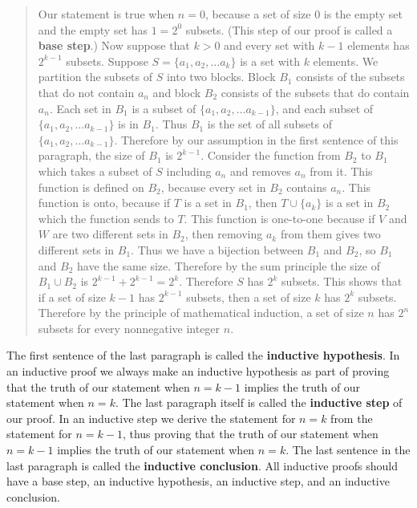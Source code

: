 \documentclass[10pt,]{book}
\newcommand{\terminology}[1]{\textbf{#1}}
\theoremstyle{plain}
\theoremstyle{definition}
\theoremstyle{definition}
\numberwithin{equation}{chapter}
\begin{document}
\begin{quote}\hypertarget{blockquote-20}{}
\hypertarget{p-1998}{}%
Our statement is true when \(n=0\), because a set of size 0 is the empty set and the empty set has \(1=2^0\) subsets. (This step of our proof is called a \terminology{base step}.) Now suppose that \(k>0\) and every set with \(k-1\) elements has \(2^{k-1}\) subsets.  Suppose \(S=\{a_1,a_2,\ldots a_k\}\) is a set with \(k\) elements. We partition the subsets of \(S\) into two blocks.  Block \(B_1\) consists of the subsets that do not contain \(a_n\) and block \(B_2\) consists of the subsets that do contain \(a_n\).  Each set in \(B_1\) is a subset of \(\{a_1,a_2,\ldots a_{k-1}\}\), and each subset of \(\{a_1,a_2, \ldots
a_{k-1}\}\) is in \(B_1\).  Thus \(B_1\) is the set of all subsets of \(\{a_1,a_2,\ldots a_{k-1}\}\).  Therefore by our assumption in the first sentence of this paragraph, the size of \(B_1\) is \(2^{k-1}\).  Consider the function from \(B_2\) to \(B_1\) which takes a subset of \(S\) including \(a_n\) and removes \(a_n\) from it.  This function is defined on \(B_2\), because every set in \(B_2\) contains \(a_n\).  This function is onto, because if \(T\) is a set in \(B_1\), then \(T\cup \{a_k\}\) is a set in \(B_2\) which the function sends to \(T\).  This function is one-to-one because if \(V\) and \(W\) are two different sets in \(B_2\), then removing \(a_k\) from them gives two different sets in \(B_1\).  Thus we have a bijection between \(B_1\) and \(B_2\), so \(B_1\) and \(B_2\) have the same size.  Therefore by the sum principle the size of \(B_1\cup B_2\) is \(2^{k-1} +2^{k-1}=2^k\).  Therefore \(S\) has \(2^k\) subsets.  This shows that if a set of size \(k-1\) has \(2^{k-1}\) subsets, then a set of size \(k\) has \(2^k\) subsets.  Therefore by the principle of mathematical induction, a set of size \(n\) has \(2^n\) subsets for every nonnegative integer \(n\).%
\end{quote}
\hypertarget{p-1999}{}%
The first sentence of the last paragraph is called the \terminology{inductive hypothesis}. In an inductive proof we always make an inductive hypothesis as part of proving that the truth of our statement when \(n=k-1\) implies the truth of our statement when \(n=k\). The last paragraph itself is called the \terminology{inductive step} of our proof. In an inductive step we derive the statement for \(n=k\) from the statement for \(n=k-1\), thus proving that the truth of our statement when \(n=k-1\) implies the truth of our statement when \(n=k\). The last sentence in the last paragraph is called the \terminology{inductive conclusion}. All inductive proofs should have a base step, an inductive hypothesis, an inductive step, and an inductive conclusion.%
\end{document}

